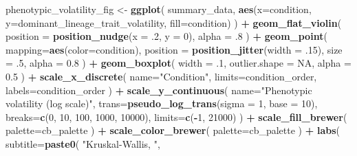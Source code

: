 \documentclass[]{book}
\newenvironment{Shaded}{\begin{snugshade}}{\end{snugshade}}
\newcommand{\DataTypeTok}[1]{\textcolor[rgb]{0.13,0.29,0.53}{#1}}
\newcommand{\DecValTok}[1]{\textcolor[rgb]{0.00,0.00,0.81}{#1}}
\newcommand{\FloatTok}[1]{\textcolor[rgb]{0.00,0.00,0.81}{#1}}
\newcommand{\KeywordTok}[1]{\textcolor[rgb]{0.13,0.29,0.53}{\textbf{#1}}}
\newcommand{\NormalTok}[1]{#1}
\newcommand{\OperatorTok}[1]{\textcolor[rgb]{0.81,0.36,0.00}{\textbf{#1}}}
\newcommand{\OtherTok}[1]{\textcolor[rgb]{0.56,0.35,0.01}{#1}}
\newcommand{\StringTok}[1]{\textcolor[rgb]{0.31,0.60,0.02}{#1}}
\begin{document}
\begin{Shaded}
\begin{Highlighting}[]
{{{{\NormalTok{phenotypic_volatility_fig <-}\StringTok{ }\KeywordTok{ggplot}\NormalTok{(}
\NormalTok{    summary_data,}
    \KeywordTok{aes}\NormalTok{(}\DataTypeTok{x=}\NormalTok{condition, }\DataTypeTok{y=}\NormalTok{dominant_lineage_trait_volatility, }\DataTypeTok{fill=}\NormalTok{condition)}
\NormalTok{  ) }\OperatorTok{+}
\StringTok{  }\KeywordTok{geom_flat_violin}\NormalTok{(}
    \DataTypeTok{position =} \KeywordTok{position_nudge}\NormalTok{(}\DataTypeTok{x =} \FloatTok{.2}\NormalTok{, }\DataTypeTok{y =} \DecValTok{0}\NormalTok{),}
    \DataTypeTok{alpha =} \FloatTok{.8}
\NormalTok{  ) }\OperatorTok{+}
\StringTok{  }\KeywordTok{geom_point}\NormalTok{(}
    \DataTypeTok{mapping=}\KeywordTok{aes}\NormalTok{(}\DataTypeTok{color=}\NormalTok{condition),}
    \DataTypeTok{position =} \KeywordTok{position_jitter}\NormalTok{(}\DataTypeTok{width =} \FloatTok{.15}\NormalTok{),}
    \DataTypeTok{size =} \FloatTok{.5}\NormalTok{,}
    \DataTypeTok{alpha =} \FloatTok{0.8}
\NormalTok{  ) }\OperatorTok{+}
\StringTok{  }\KeywordTok{geom_boxplot}\NormalTok{(}
    \DataTypeTok{width =} \FloatTok{.1}\NormalTok{,}
    \DataTypeTok{outlier.shape =} \OtherTok{NA}\NormalTok{,}
    \DataTypeTok{alpha =} \FloatTok{0.5}
\NormalTok{  ) }\OperatorTok{+}
\StringTok{  }\KeywordTok{scale_x_discrete}\NormalTok{(}
    \DataTypeTok{name=}\StringTok{"Condition"}\NormalTok{,}
    \DataTypeTok{limits=}\NormalTok{condition_order,}
    \DataTypeTok{labels=}\NormalTok{condition_order}
\NormalTok{  ) }\OperatorTok{+}
\StringTok{  }\KeywordTok{scale_y_continuous}\NormalTok{(}
    \DataTypeTok{name=}\StringTok{"Phenotypic volatility (log scale)"}\NormalTok{,}
    \DataTypeTok{trans=}\KeywordTok{pseudo_log_trans}\NormalTok{(}\DataTypeTok{sigma =} \DecValTok{1}\NormalTok{, }\DataTypeTok{base =} \DecValTok{10}\NormalTok{),}
    \DataTypeTok{breaks=}\KeywordTok{c}\NormalTok{(}\DecValTok{0}\NormalTok{, }\DecValTok{10}\NormalTok{, }\DecValTok{100}\NormalTok{, }\DecValTok{1000}\NormalTok{, }\DecValTok{10000}\NormalTok{),}
    \DataTypeTok{limits=}\KeywordTok{c}\NormalTok{(}\OperatorTok{-}\DecValTok{1}\NormalTok{, }\DecValTok{21000}\NormalTok{)}
\NormalTok{  ) }\OperatorTok{+}
\StringTok{  }\KeywordTok{scale_fill_brewer}\NormalTok{(}
    \DataTypeTok{palette=}\NormalTok{cb_palette}
\NormalTok{  ) }\OperatorTok{+}
\StringTok{  }\KeywordTok{scale_color_brewer}\NormalTok{(}
    \DataTypeTok{palette=}\NormalTok{cb_palette}
\NormalTok{  ) }\OperatorTok{+}
\StringTok{  }\KeywordTok{labs}\NormalTok{(}
    \DataTypeTok{subtitle=}\KeywordTok{paste0}\NormalTok{(}
      \StringTok{"Kruskal-Wallis, "}\NormalTok{,}
}}}}
\end{Highlighting}
\end{Shaded}
\end{document}
